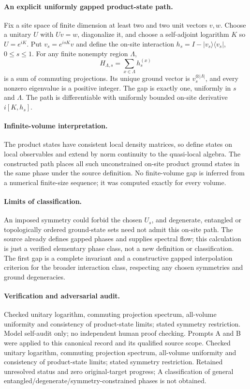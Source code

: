 \documentclass[11pt]{article}
\begin{document}
\paragraph{An explicit uniformly gapped product-state path.} Fix a site space of finite dimension at least two and two unit vectors $v,w$. Choose a unitary $U$ with $Uv=w$, diagonalize it, and choose a self-adjoint logarithm $K$ so $U=e^{iK}$. Put $v_s=e^{isK}v$ and define the on-site interaction $h_s=I-|v_s\rangle\langle v_s|$, $0\leq s\leq1$. For any finite nonempty region $\Lambda$,
\[
 H_{\Lambda,s}=\sum_{x\in\Lambda}h_s^{(x)}
\]
is a sum of commuting projections. Its unique ground vector is $v_s^{\otimes|\Lambda|}$, and every nonzero eigenvalue is a positive integer. The gap is exactly one, uniformly in $s$ and $\Lambda$. The path is differentiable with uniformly bounded on-site derivative $i[K,h_s]$.

\paragraph{Infinite-volume interpretation.} The product states have consistent local density matrices, so define states on local observables and extend by norm continuity to the quasi-local algebra. The constructed path places all such unconstrained on-site product ground states in the same phase under the source definition. No finite-volume gap is inferred from a numerical finite-size sequence; it was computed exactly for every volume.

\paragraph{Limits of classification.} An imposed symmetry could forbid the chosen $U_s$, and degenerate, entangled or topologically ordered ground-state sets need not admit this on-site path. The source already defines gapped phases and supplies spectral flow; this calculation is just a verified elementary phase class, not a new definition or classification. The first gap is a complete invariant and a constructive gapped interpolation criterion for the broader interaction class, respecting any chosen symmetries and ground degeneracies.

\paragraph{Verification and adversarial audit.}
Checked unitary logarithm, commuting projection spectrum, all-volume uniformity and consistency of product-state limits; stated symmetry restriction. Model self-audit only; no independent human proof checking. Prompts A and B were applied to this canonical record and its qualified source scope. Checked unitary logarithm, commuting projection spectrum, all-volume uniformity and consistency of product-state limits; stated symmetry restriction. Retained unresolved status and zero original-target progress; A classification of general entangled/degenerate/symmetry-constrained phases is not obtained.
\end{document}
